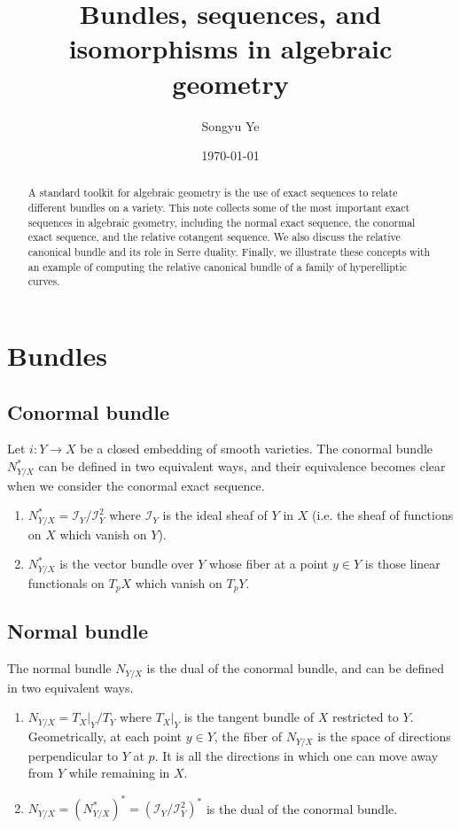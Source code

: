 \documentclass[12pt]{article}
\begin{document}
\rhead{\today}
\cfoot{\thepage}

\title{Bundles, sequences, and isomorphisms in algebraic geometry}

\author{Songyu Ye}
\date{\today}
\maketitle


\begin{abstract}
A standard toolkit for algebraic geometry is the use of exact sequences to relate different bundles on a variety. This note collects some of the most important exact sequences in algebraic geometry, including the normal exact sequence, the conormal exact sequence, and the relative cotangent sequence. We also discuss the relative canonical bundle and its role in Serre duality. Finally, we illustrate these concepts with an example of computing the relative canonical bundle of a family of hyperelliptic curves.
\end{abstract}

\tableofcontents

\section{Bundles}
\subsection{Conormal bundle}
Let $i: Y \to X$ be a closed embedding of smooth varieties. The conormal bundle $N^*_{Y/X}$ can be defined in two equivalent ways, and their equivalence becomes clear when we consider the conormal exact sequence.

\begin{enumerate}
    \item $N^*_{Y/X} = \mathcal{I}_Y/\mathcal{I}_Y^2$ where $\mathcal{I}_Y$ is the ideal sheaf of $Y$ in $X$ (i.e. the sheaf of functions on $X$ which vanish on $Y$).
    \item $N^*_{Y/X}$ is the vector bundle over $Y$ whose fiber at a point $y\in Y$ is those linear functionals on $T_pX$ which vanish on $T_pY$.
\end{enumerate}

\subsection{Normal bundle}
The normal bundle $N_{Y/X}$ is the dual of the conormal bundle, and can be defined in two equivalent ways.
\begin{enumerate}
    \item $N_{Y/X} = T_X\vert_Y / T_Y$ where $T_X\vert_Y$ is the tangent bundle of $X$ restricted to $Y$. Geometrically, at each point $y\in Y$, the fiber of $N_{Y/X}$ is the space of directions perpendicular to $Y$ at $p$. It is all the directions in which one can move away from $Y$ while remaining in $X$.
    \item $N_{Y/X} = (N^*_{Y/X})^* = (\mathcal{I}_Y/\mathcal{I}_Y^2)^*$ is the dual of the conormal bundle.
    \end{enumerate}
\end{document}
